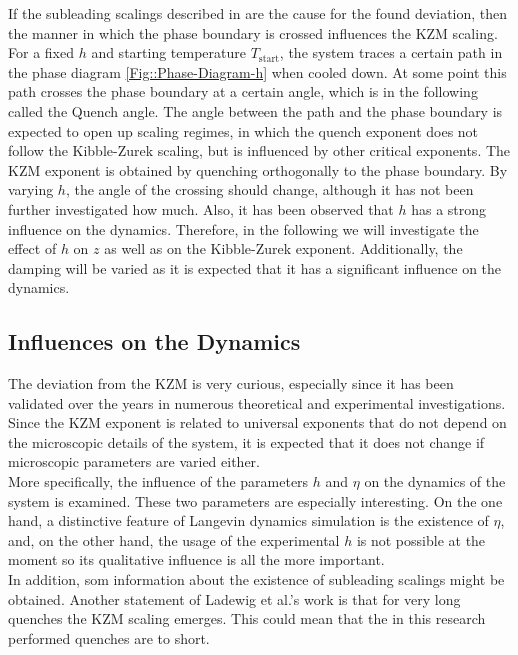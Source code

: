 	If the subleading scalings described in \cite{ladewig2020kibble} are the cause for the found deviation, then the manner in which the phase boundary is crossed influences the KZM	scaling. For a fixed $h$ and starting temperature $T_{\text{start}}$, the system traces a certain path in the phase diagram \autoref{Fig::Phase-Diagram-h} when cooled down. At some point this path crosses the phase boundary at a certain angle, which is in the following called the Quench angle. The angle between the path and the phase boundary is expected to open up scaling regimes, in which the quench exponent does not follow the Kibble-Zurek scaling, but is influenced by other critical exponents. The KZM exponent is obtained by quenching orthogonally to the phase boundary. By varying $h$, the angle of the crossing should change, although it has not been further investigated how much. Also, it has been observed that $h$ has a strong influence on the dynamics. Therefore, in the following we will investigate the effect of $h$ on $z$ as well as on the Kibble-Zurek exponent. Additionally, the damping will be varied as it is expected that it has a significant influence on the dynamics.
	\subsection{Influences on the Dynamics}
	The deviation from the KZM is very curious, especially since it has been validated over the years in numerous theoretical and experimental investigations. Since the KZM exponent is related to universal exponents that do not depend on the microscopic details of the system, it is expected that it does not change if microscopic parameters are varied either. \\
	
	More specifically, the influence of the parameters $h$ and $\eta$ on the dynamics of the system is examined. These two parameters are especially interesting. On the one hand, a distinctive feature of Langevin dynamics simulation is the existence of $\eta$, and, on the other hand, the usage of the experimental $h$ is not possible at the moment so its qualitative influence is all the more important. \\
	
	In addition, som information about the existence of subleading scalings \cite{ladewig2020kibble} might be obtained. Another statement of Ladewig et al.'s work \cite{ladewig2020kibble} is that for very long quenches the KZM scaling emerges. This could mean that the in this research performed quenches are to short. \\
	
